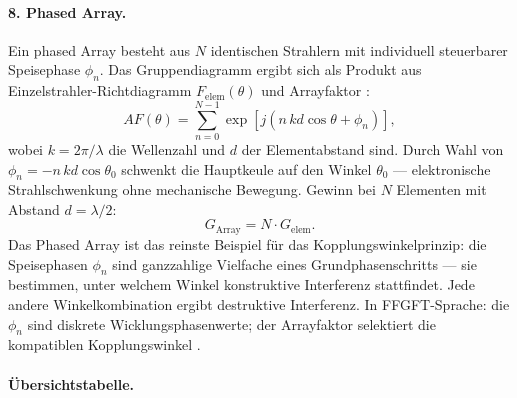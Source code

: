 \paragraph{8. Phased Array.}

Ein phased Array besteht aus $N$ identischen Strahlern mit individuell
steuerbarer Speisephase $\phi_n$. Das Gruppendiagramm ergibt sich als
Produkt aus Einzelstrahler-Richtdiagramm $F_\mathrm{elem}(\theta)$ und
Arrayfaktor \cite{Mailloux2017,Balanis2016}:
\[
  AF(\theta) = \sum_{n=0}^{N-1} \exp\!\left[j\left(n\,kd\cos\theta + \phi_n\right)\right],
\]
wobei $k = 2\pi/\lambda$ die Wellenzahl und $d$ der Elementabstand sind.
Durch Wahl von $\phi_n = -n\,kd\cos\theta_0$ schwenkt die Hauptkeule auf
den Winkel $\theta_0$ --- elektronische Strahlschwenkung ohne mechanische
Bewegung. Gewinn bei $N$ Elementen mit Abstand $d = \lambda/2$:
\[
  G_\mathrm{Array} = N \cdot G_\mathrm{elem}.
\]
Das Phased Array ist das reinste Beispiel für das Kopplungswinkelprinzip:
die Speisephasen $\phi_n$ sind ganzzahlige Vielfache eines Grundphasenschritts
--- sie bestimmen, unter welchem Winkel konstruktive Interferenz stattfindet.
Jede andere Winkelkombination ergibt destruktive Interferenz. In FFGFT-Sprache:
die $\phi_n$ sind diskrete Wicklungsphasenwerte; der Arrayfaktor selektiert
die kompatiblen Kopplungswinkel \SM.

\paragraph{Übersichtstabelle.}

